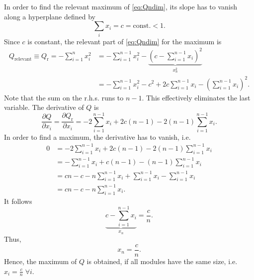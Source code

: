In order to find the relevant maximum of \eqref{eq:Qndim}, its slope has to vanish along a hyperplane defined by
\begin{equation}\label{qmehrdimbedingung}
\sum _i x_i = c = \text{const.} <1.
\end{equation}
%
Since $c$ is constant, the relevant part of \eqref{eq:Qndim} for the maximum is
\begin{align}
Q_{\text{relevant}}\equiv Q_\text{r}= -\sum _{i=1}^n x_i^2&=-\sum _{i=1}^{n-1} x_i^2- \underbrace{ \left( 
c-\sum _{i=1}^{n-1} x_i \right) ^2 }_{x_n^2} \label{eq:relevant_Q}\\
&= -\sum _{i=1}^{n-1} x_i^2 - c^2 + 2c\sum _{i=1}^{n-1} x_i -\left( \sum _{i=1}^{n-1} x_i \right) ^2. \nonumber
\end{align}
Note that the sum on the r.h.s. runs to $n-1$.
This effectively eliminates the last variable.
The derivative of $Q$ is
\begin{equation}
\frac{\partial Q}{\partial x_i}= \frac{\partial Q_\text{r}}{\partial x_i}=- 2\sum _{i=1}^{n-1} x_i + 2c(n-1)-2 (n-1) \sum _{i=1}^{n-1} x_i.
\end{equation}
%
In order to find a maximum, the derivative has to vanish, i.e.
\begin{align*}
0&=- 2\sum _{i=1}^{n-1} x_i + 2c(n-1)-2 (n-1) \sum _{i=1}^{n-1} x_i \\
&=- \sum _{i=1}^{n-1} x_i + c(n-1) - (n-1) \sum _{i=1}^{n-1} x_i \\
 &= cn-c-n\sum _{i=1}^{n-1} x_i +\sum _{i=1}^{n-1} x_i -\sum _{i=1}^{n-1} x_i\\
 &= cn-c-n\sum _{i=1}^{n-1} x_i .
\end{align*}
It follows
\[
\underbrace{c-\sum _{i=1}^{n-1} x_i}_{x_n} =\frac{c}{n}.
\]
Thus,
\begin{equation}
x_n=\frac{c}{n}.
\end{equation}
Hence, the maximum of $Q$ is obtained, if all modules have the same size, i.e. $x_i=\frac{c}{n} \; \forall i$.

